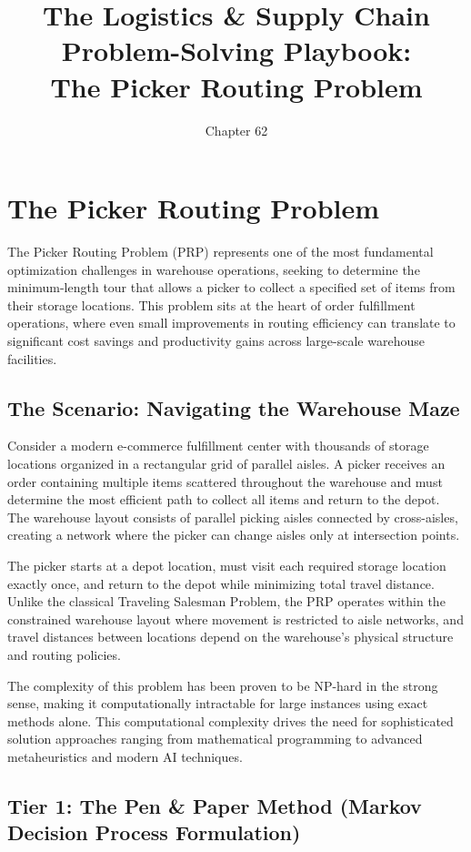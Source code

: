 \documentclass{article}
\title{The Logistics \& Supply Chain Problem-Solving Playbook:\\The Picker Routing Problem}
\author{Chapter 62}
\date{}
\begin{document}
\maketitle

\section{The Picker Routing Problem}

The Picker Routing Problem (PRP) represents one of the most fundamental optimization challenges in warehouse operations, seeking to determine the minimum-length tour that allows a picker to collect a specified set of items from their storage locations. This problem sits at the heart of order fulfillment operations, where even small improvements in routing efficiency can translate to significant cost savings and productivity gains across large-scale warehouse facilities.

\subsection{The Scenario: Navigating the Warehouse Maze}

Consider a modern e-commerce fulfillment center with thousands of storage locations organized in a rectangular grid of parallel aisles. A picker receives an order containing multiple items scattered throughout the warehouse and must determine the most efficient path to collect all items and return to the depot. The warehouse layout consists of parallel picking aisles connected by cross-aisles, creating a network where the picker can change aisles only at intersection points.

The picker starts at a depot location, must visit each required storage location exactly once, and return to the depot while minimizing total travel distance. Unlike the classical Traveling Salesman Problem, the PRP operates within the constrained warehouse layout where movement is restricted to aisle networks, and travel distances between locations depend on the warehouse's physical structure and routing policies.

The complexity of this problem has been proven to be NP-hard in the strong sense, making it computationally intractable for large instances using exact methods alone. This computational complexity drives the need for sophisticated solution approaches ranging from mathematical programming to advanced metaheuristics and modern AI techniques.

\subsection{Tier 1: The Pen \& Paper Method (Markov Decision Process Formulation)}
\end{document}
